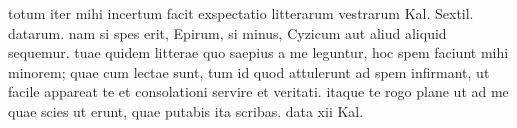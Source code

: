 


 totum iter mihi incertum facit exspectatio litterarum vestrarum Kal. Sextil. datarum. nam si spes erit, Epirum, si minus, Cyzicum aut aliud aliquid sequemur. tuae quidem litterae quo saepius a me leguntur, hoc spem faciunt mihi minorem; quae cum lectae sunt, tum id quod attulerunt ad spem infirmant, ut facile appareat te et consolationi servire et veritati. itaque te rogo plane ut ad me quae scies ut erunt, quae putabis ita scribas. data xii Kal.
